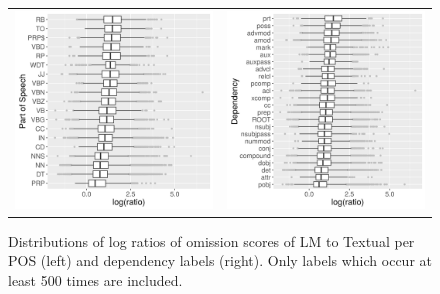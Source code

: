 \begin{figure}[t]
  \centering
  \hspace*{-0.2in}
  \setlength{\tabcolsep}{0pt}
  \begin{tabular}{cc}
  \includegraphics[scale=0.55]{imaginet-omission-quotient-pos-boxplot.png} &
  \includegraphics[scale=0.55]{imaginet-omission-quotient-dep-boxplot.png} \\  
  \end{tabular}
  \caption{Distributions of log ratios of omission scores of {\sc LM} to {\sc Textual} per
    POS (left) and dependency labels (right). Only labels which occur at least 500 times are included.}
\label{fig:omission-imaginet-ratio}
\end{figure}


